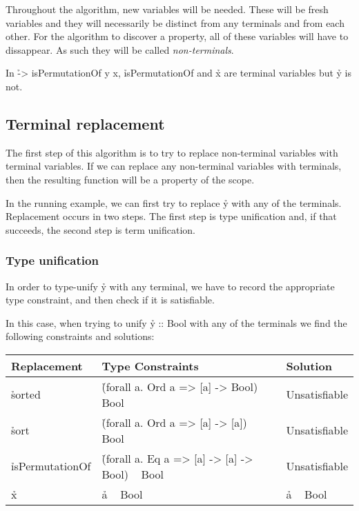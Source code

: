 \documentclass[a4paper, 11pt]{article}
\begin{document}
Throughout the algorithm, new variables will be needed.
These will be fresh variables and they will necessarily be distinct from any terminals and from each other.
For the algorithm to discover a property, all of these variables will have to dissappear.
As such they will be called \emph{non-terminals}.

\begin{ex}
  In \h{\x -> isPermutationOf y x}, \h{isPermutationOf} and \h{x} are terminal variables but \h{y} is not.
\end{ex}


\subsection{Terminal replacement}

The first step of this algorithm is to try to replace non-terminal variables with terminal variables.
If we can replace any non-terminal variables with terminals, then the resulting function will be a property of the scope.

In the running example, we can first try to replace \h{y} with any of the terminals.
Replacement occurs in two steps.
The first step is type unification and, if that succeeds, the second step is term unification.

\subsubsection{Type unification}

In order to type-unify \h{y} with any terminal, we have to record the appropriate type constraint, and then check if it is satisfiable.

In this case, when trying to unify \h{y :: Bool} with any of the terminals we find the following constraints and solutions:

\begin{tabular}{|l|l|l|}
  \hline
  Replacement & Type Constraints & Solution \\
  \hline
  \hline
  \h{sorted} & \h{(forall a. Ord a => [a] -> Bool) ~ Bool} & Unsatisfiable \\
  \hline
  \h{sort} & \h{(forall a. Ord a => [a] -> [a]) ~ Bool} & Unsatisfiable \\
  \hline
  \h{isPermutationOf} & \h{(forall a. Eq a => [a] -> [a] -> Bool) ~ Bool} & Unsatisfiable \\
  \hline
  \h{x} & \h{a ~ Bool} & \h{a ~ Bool} \\
  \hline
\end{tabular}
\end{document}

